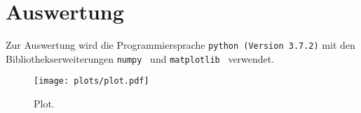\section{Auswertung}
Zur Auswertung wird die Programmiersprache \texttt{python (Version 3.7.2)} mit
den Bibliothekserweiterungen \texttt{numpy}~\cite{numpy} und \texttt{matplotlib}~\cite{matplotlib} verwendet.

\begin{figure}
  \centering
  \texttt{[image: plots/plot.pdf]}
  \caption{Plot.}
  \label{fig:plot}
\end{figure}
